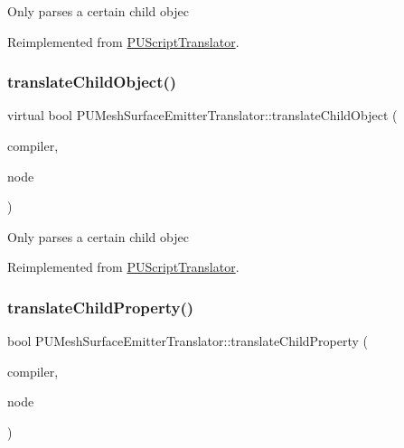 Only parses a certain child objec 

Reimplemented from \hyperlink{classPUScriptTranslator_ab587d01348ae3e678cb700c719b2b113}{P\+U\+Script\+Translator}.

\mbox{\label{classPUMeshSurfaceEmitterTranslator_a7d8b36e8528847c02c20a899e7cfd651}} 
\subsubsection{\texorpdfstring{translate\+Child\+Object()}{translateChildObject()}\hspace{0.1cm}{\footnotesize\ttfamily [2/2]}}
{\footnotesize\ttfamily virtual bool P\+U\+Mesh\+Surface\+Emitter\+Translator\+::translate\+Child\+Object (\begin{DoxyParamCaption}\item[{\hyperlink{classPUScriptCompiler}{P\+U\+Script\+Compiler} $\ast$}]{compiler,  }\item[{\hyperlink{classPUAbstractNode}{P\+U\+Abstract\+Node} $\ast$}]{node }\end{DoxyParamCaption})\hspace{0.3cm}{\ttfamily [virtual]}}

Only parses a certain child objec 

Reimplemented from \hyperlink{classPUScriptTranslator_ab587d01348ae3e678cb700c719b2b113}{P\+U\+Script\+Translator}.

\mbox{\label{classPUMeshSurfaceEmitterTranslator_abda70a21c5d7d3803e31b1ad86fa895d}} 
\subsubsection{\texorpdfstring{translate\+Child\+Property()}{translateChildProperty()}\hspace{0.1cm}{\footnotesize\ttfamily [1/2]}}
{\footnotesize\ttfamily bool P\+U\+Mesh\+Surface\+Emitter\+Translator\+::translate\+Child\+Property (\begin{DoxyParamCaption}\item[{\hyperlink{classPUScriptCompiler}{P\+U\+Script\+Compiler} $\ast$}]{compiler,  }\item[{\hyperlink{classPUAbstractNode}{P\+U\+Abstract\+Node} $\ast$}]{node }\end{DoxyParamCaption})\hspace{0.3cm}{\ttfamily [virtual]}}

